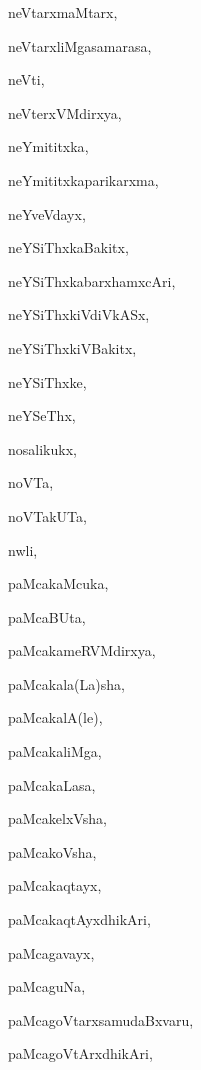 \begin{multicols}{2}
{neVtarxmaMtarx}, \pageref{neVtarxmaMtarx}

{neVtarxliMgasamarasa}, \pageref{neVtarxliMgasamarasa}

{neVti}, \pageref{neVti}

{neVterxVMdirxya}, \pageref{neVterxVMdirxya}

{neYmititxka}, \pageref{neYmititxka}

{neYmititxkaparikarxma}, \pageref{neYmititxkaparikarxma}

{neYveVdayx}, \pageref{neYveVdayx}

{neYSiThxkaBakitx}, \pageref{neYSiThxkaBakitx}

{neYSiThxkabarxhamxcAri}, \pageref{neYSiThxkabarxhamxcAri}

{neYSiThxkiVdiVkASx}, \pageref{neYSiThxkiVdiVkASx}

{neYSiThxkiVBakitx}, \pageref{neYSiThxkiVBakitx}

{neYSiThxke}, \pageref{neYSiThxke}

{neYSeThx}, \pageref{neYSeThx}

{nosalikukx}, \pageref{nosalikukx}

{noVTa}, \pageref{noVTa}

{noVTakUTa}, \pageref{noVTakUTa}

{nwli}, \pageref{nwli}

{paMcakaMcuka}, \pageref{paMcakaMcuka}

{paMcaBUta}, \pageref{paMcaBUta1}

{paMcakameRVMdirxya}, \pageref{paMcakameRVMdirxya}

{paMcakala(La)sha}, \pageref{paMcakalaLasha}

{paMcakalA(le)}, \pageref{paMcakalAle}

{paMcakaliMga}, \pageref{paMcakaliMga}

{paMcakaLasa}, \pageref{paMcakaLasa}

{paMcakelxVsha}, \pageref{paMcakelxVsha}

{paMcakoVsha}, \pageref{paMcakoVsha}

{paMcakaqtayx}, \pageref{paMcakaqtayx}

{paMcakaqtAyxdhikAri}, \pageref{paMcakaqtAyxdhikAri}

{paMcagavayx}, \pageref{paMcagavayx}

{paMcaguNa}, \pageref{paMcaguNa}

{paMcagoVtarxsamudaBxvaru}, \pageref{paMcagoVtarxsamudaBxvaru}

{paMcagoVtArxdhikAri}, \pageref{paMcagoVtArxdhikAri}


\end{multicols}
